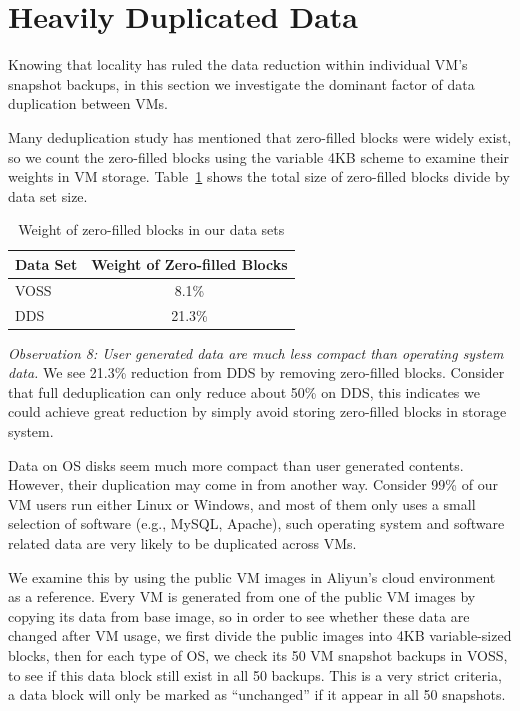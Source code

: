 \section{Heavily Duplicated Data}
Knowing that locality has ruled the 
data reduction within individual VM's snapshot backups,
in this section we investigate the dominant factor
of data duplication between VMs. 

Many deduplication study has mentioned that zero-filled
blocks were widely exist, so we count the
zero-filled blocks using the variable 4KB scheme to examine their weights in VM storage.
Table~\ref{tab:zero} shows the total size of zero-filled
blocks divide by data set size.

\begin{table}[htb]
  \centering
    \begin{tabular}{|l|c|}
        \hline
        Data Set & Weight of Zero-filled Blocks\\ \hline
        VOSS & 8.1\% \\ \hline
        DDS & 21.3\% \\
        \hline
    \end{tabular}
    \caption{Weight of zero-filled blocks in our data sets}
    \label{tab:zero}
\end{table}

\emph{Observation 8: User generated data are much less compact than operating system data.}
We see 21.3\% reduction from DDS by removing zero-filled blocks. Consider
that full deduplication can only reduce about 50\% on DDS, this indicates we could
achieve great reduction by simply avoid storing zero-filled blocks in storage system.

Data on OS disks seem much more compact than
user generated contents. However, their duplication may come in from another way.
Consider 99\% of our VM users run either Linux or Windows, and most of them only uses
a small selection of software (e.g., MySQL, Apache), such
operating system and software related data are very likely to be duplicated
across VMs.

We examine this by using the public VM images in Aliyun's cloud environment as a reference.
Every VM is generated from one of the public VM images by copying its data from base image,
so in order to see whether these data are changed after VM usage,
we first divide the public images into 4KB variable-sized blocks, then for each type of
OS, we check its 50 VM snapshot backups in VOSS, to see if this data block still exist in all
50 backups. This is a very strict criteria, a data block will only be marked as ``unchanged''
if it appear in all 50 snapshots.

